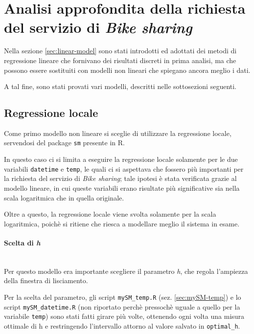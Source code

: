 \section{Analisi approfondita della richiesta del servizio di \emph{Bike
sharing}}
\label{sec:non-linear}

Nella sezione \ref{sec:linear-model} sono stati introdotti ed adottati dei
metodi di regressione lineare che fornivano dei risultati discreti in prima
analisi, ma che possono essere sostituiti con modelli non lineari che spiegano
ancora meglio i dati.

A tal fine, sono stati provati vari modelli, descritti nelle sottosezioni
seguenti.


\subsection{Regressione locale}\label{sec:local-regression}
Come primo modello non lineare si sceglie di utilizzare la regressione locale,
servendosi del package \texttt{sm} presente in R.

In questo caso ci si limita a eseguire la regressione locale solamente per le
due variabili \texttt{datetime} e \texttt{temp}, le quali ci si aspettava che
fossero più importanti per la richiesta del servizio di \emph{Bike sharing};
tale ipotesi è stata verificata grazie al modello lineare, in cui queste
variabili erano risultate più significative sia nella scala logaritmica che in
quella originale.

Oltre a questo, la regressione locale viene svolta solamente per la scala
logaritmica, poichè si ritiene che riesca a modellare meglio il sistema in
esame.

\paragraph{Scelta di \emph{h}} \mbox{}\\
Per questo modello era importante scegliere il parametro \emph{h}, che regola
l'ampiezza della finestra di lisciamento.

Per la scelta del parametro, gli script \texttt{mySM\_temp.R} (sez.
\ref{sec:mySM-temp}) e lo script \texttt{mySM\_datetime.R} (non riportato
perchè pressochè uguale a quello per la variabile \texttt{temp}) sono stati
fatti girare più volte, ottenendo ogni volta una misura ottimale di h e
restringendo l'intervallo attorno al valore salvato in \texttt{optimal\_h}.

